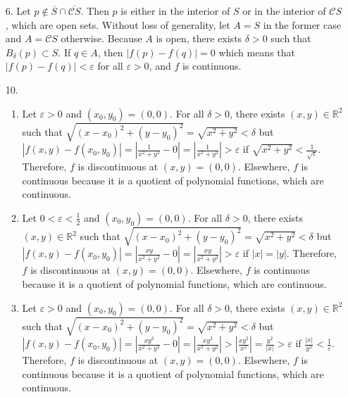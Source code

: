 \documentclass[a4paper,12pt]{article}
\begin{document}
\begin{enumerate}
        \item[6.]
            Let $p \notin \overline{S} \cap \overline{\mathcal{C}S}$. Then $p$ is either in the interior of $S$ or in the interior of $\mathcal{C}S$, which are open sets. Without loss of generality, let $A = S$ in the former case and $A = \mathcal{C}S$ otherwise. Because $A$ is open, there exists $\delta > 0$ such that $B_\delta(p) \subset S$. If $q \in A$, then $|f(p) - f(q)| = 0$ which means that $|f(p) - f(q)| < \varepsilon$ for all $\varepsilon > 0$, and $f$ is continuous.

        \item[10.]
            \begin{enumerate}
                \item
                    Let $\varepsilon > 0$ and $(x_0, y_0) = (0, 0)$. For all $\delta > 0$, there exists $(x, y) \in \mathbb{R}^2$ such that $\sqrt{(x - x_0)^2 + (y - y_0)^2} = \sqrt{x^2 + y^2} < \delta$ but $|f(x, y) - f(x_0, y_0)| = \left| \frac{1}{x^2 + y^2} - 0 \right| = \left| \frac{1}{x^2 + y^2} \right| > \varepsilon$ if $\sqrt{x^2 + y^2} < \frac{1}{\sqrt{\varepsilon}}$. Therefore, $f$ is discontinuous at $(x, y) = (0, 0)$. Elsewhere, $f$ is continuous because it is a quotient of polynomial functions, which are continuous.

                \item
                    Let $0 < \varepsilon < \frac{1}{2}$ and $(x_0, y_0) = (0, 0)$. For all $\delta > 0$, there exists $(x, y) \in \mathbb{R}^2$ such that $\sqrt{(x - x_0)^2 + (y - y_0)^2} = \sqrt{x^2 + y^2} < \delta$ but $|f(x, y) - f(x_0, y_0)| = \left| \frac{xy}{x^2 + y^2} - 0 \right| = \left| \frac{xy}{x^2 + y^2} \right| > \varepsilon$ if $|x| = |y|$. Therefore, $f$ is discontinuous at $(x, y) = (0, 0)$. Elsewhere, $f$ is continuous because it is a quotient of polynomial functions, which are continuous.

                \item
                    Let $\varepsilon > 0$ and $(x_0, y_0) = (0, 0)$. For all $\delta > 0$, there exists $(x, y) \in \mathbb{R}^2$ such that $\sqrt{(x - x_0)^2 + (y - y_0)^2} = \sqrt{x^2 + y^2} < \delta$ but $|f(x, y) - f(x_0, y_0)| = \left| \frac{xy^2}{x^2 + y^2} - 0 \right| = \left| \frac{xy^2}{x^2 + y^2} \right| > \left| \frac{xy^2}{x^2} \right| = \frac{y^2}{|x|} >  \varepsilon$ if $\frac{|x|}{y^2} < \frac{1}{\varepsilon}$. Therefore, $f$ is discontinuous at $(x, y) = (0, 0)$. Elsewhere, $f$ is continuous because it is a quotient of polynomial functions, which are continuous.
            \end{enumerate}


\end{enumerate}
\end{document}
